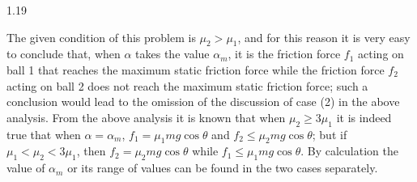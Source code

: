 \begin{solution}{1.19}
\begin{commentary}
The given condition of this problem is $\mu_2>\mu_1$, and for this reason it is very easy to conclude that, when $\alpha$ takes the value $\alpha_m$, it is the friction force $f_1$ acting on ball 1 that reaches the maximum static friction force while the friction force $f_2$ acting on ball 2 does not reach the maximum static friction force; such a conclusion would lead to the omission of the discussion of case (2) in the above analysis. From the above analysis it is known that when $\mu_2\geq3\mu_1$ it is indeed true that when $\alpha=\alpha_m$, $f_1=\mu_1mg\cos\theta$ and $f_2\leq\mu_2mg\cos\theta$; but if $\mu_1<\mu_2<3\mu_1$, then $f_2=\mu_2mg\cos\theta$ while $f_1\leq\mu_1mg\cos\theta$. By calculation the value of $\alpha_m$ or its range of values can be found in the two cases separately.
\end{commentary}
\end{solution}

